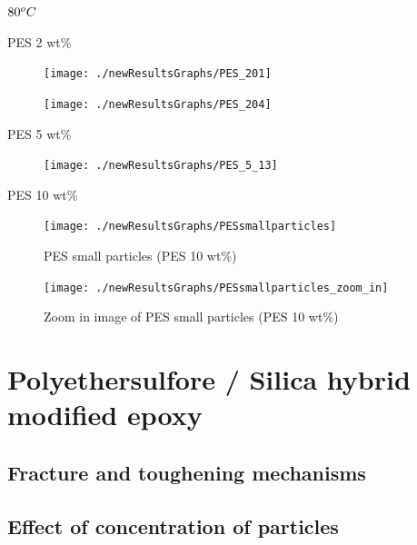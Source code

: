 \documentclass[numbers=noendperiod,chapterprefix=on]{icldt} %
\begin{document}
{$\-80 ^oC$

PES 2 wt\%

\begin{figure}[!hp]
\centering
\texttt{[image: ./newResultsGraphs/PES\_201]}
\caption{} \label{PES_201}
\end{figure}
\FloatBarrier


\begin{figure}[!hp]
\centering
\texttt{[image: ./newResultsGraphs/PES\_204]}
\caption{} \label{PES_204}
\end{figure}
\FloatBarrier
 
PES 5 wt\%
 
\begin{figure}[!hp]
\centering
\texttt{[image: ./newResultsGraphs/PES\_5\_13]}
\caption{} \label{PES_5_13}
\end{figure}
\FloatBarrier


 
PES 10 wt\% 
 
\begin{figure}[!hp]
\centering
\texttt{[image: ./newResultsGraphs/PESsmallparticles]}
\caption{PES small particles (PES 10 wt\%)} \label{PESsmallparticles}
\end{figure}
\FloatBarrier

\begin{figure}[!hp]
\centering
\texttt{[image: ./newResultsGraphs/PESsmallparticles\_zoom\_in]}
\caption{Zoom in image of PES small particles (PES 10 wt\%)} \label{PESsmallparticles_zoom_in}
\end{figure}
\FloatBarrier 
 
\section{Polyethersulfore / Silica hybrid modified epoxy} \label{Hybrid_PES_SEM}

\subsection{Fracture and toughening mechanisms}

\subsection{Effect of concentration of particles}
 
}
\end{document}

